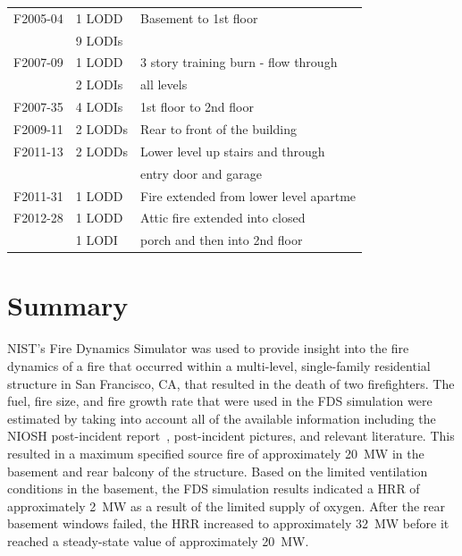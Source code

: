 \documentclass[12pt,oneside]{book}
\begin{document}
\begin{table}[!ht]
\begin{tabular}{lll}
F2005-04 \cite{NIOSH:McFall4}       &  1 LODD             &  Basement to 1st floor                   \\
                                    &  9 LODIs            &                                          \\
F2007-09 \cite{NIOSH:Tarley}        &  1 LODD             &  3 story training burn - flow through    \\
                                    &  2 LODIs            &  all levels                              \\
F2007-35 \cite{NIOSH:Braddee}       &  4 LODIs            &  1st floor to 2nd floor                  \\
F2009-11 \cite{NIOSH:Merinar}       &  2 LODDs            &  Rear to front of the building           \\
F2011-13 \cite{NIOSH:Bowyer2}       &  2 LODDs            &  Lower level up stairs and through       \\
                                    &                     &  entry door and garage                   \\
F2011-31 \cite{NIOSH:Loflin}        &  1 LODD             &  Fire extended from lower level apartme  \\
F2012-28 \cite{NIOSH:Bowyer}        &  1 LODD             &  Attic fire extended into closed         \\
                                    &  1 LODI             &  porch and then into 2nd floor           \\
\bottomrule
\end{tabular}
\label{tab:LODD}
\end{table}


\chapter{Summary}
\label{sec:summary}

NIST's Fire Dynamics Simulator was used to provide insight into the fire dynamics of a fire that occurred within a multi-level, single-family residential structure in San Francisco, CA, that resulted in the death of two firefighters. The fuel, fire size, and fire growth rate that were used in the FDS simulation were estimated by taking into account all of the available information including the NIOSH post-incident report~\cite{NIOSH:Bowyer2}, post-incident pictures, and relevant literature. This resulted in a maximum specified source fire of approximately 20~MW in the basement and rear balcony of the structure. Based on the limited ventilation conditions in the basement, the FDS simulation results indicated a HRR of approximately 2~MW as a result of the limited supply of oxygen. After the rear basement windows failed, the HRR increased to approximately 32~MW before it reached a steady-state value of approximately 20~MW.
\end{document}
